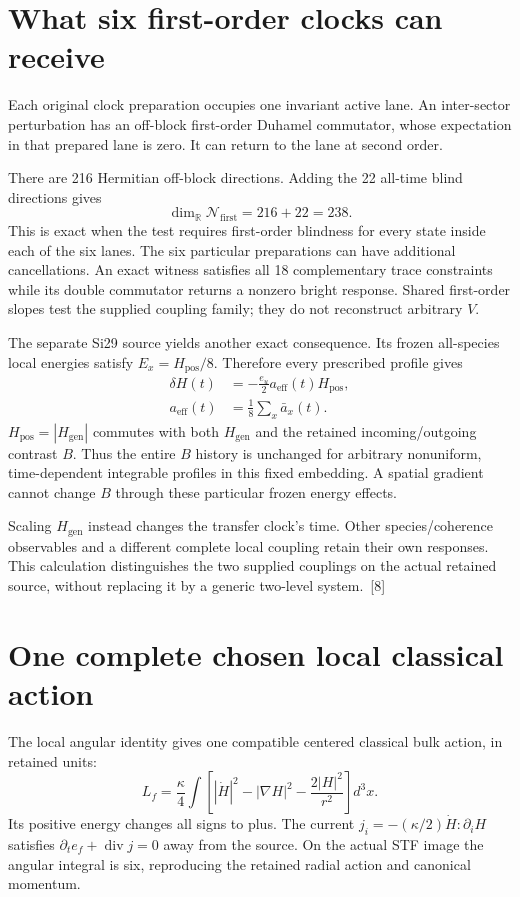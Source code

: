 \documentclass[10pt,twocolumn,letterpaper]{article}
\begin{document}
\section{What six first-order clocks can receive}
Each original clock preparation occupies one invariant active lane. An inter-sector perturbation has an off-block first-order Duhamel commutator, whose expectation in that prepared lane is zero. It can return to the lane at second order.

There are 216 Hermitian off-block directions. Adding the 22 all-time blind directions gives
\[
\dim_{\mathbb R}\mathcal N_{\mathrm{first}}=216+22=238.
\]
This is exact when the test requires first-order blindness for every state inside each of the six lanes. The six particular preparations can have additional cancellations. An exact witness satisfies all 18 complementary trace constraints while its double commutator returns a nonzero bright response. Shared first-order slopes test the supplied coupling family; they do not reconstruct arbitrary $V$.

The separate Si29 source yields another exact consequence. Its frozen all-species local energies satisfy $E_x=H_{\mathrm{pos}}/8$. Therefore every prescribed profile gives
\[
\begin{aligned}
\delta H(t)&=-\frac{e_u}{2}a_{\mathrm{eff}}(t)H_{\mathrm{pos}},\\
a_{\mathrm{eff}}(t)&=\frac18\sum_x\bar a_x(t).
\end{aligned}
\]
$H_{\mathrm{pos}}=|H_{\mathrm{gen}}|$ commutes with both $H_{\mathrm{gen}}$ and the retained incoming/outgoing contrast $B$. Thus the entire $B$ history is unchanged for arbitrary nonuniform, time-dependent integrable profiles in this fixed embedding. A spatial gradient cannot change $B$ through these particular frozen energy effects.

Scaling $H_{\mathrm{gen}}$ instead changes the transfer clock's time. Other species/coherence observables and a different complete local coupling retain their own responses. This calculation distinguishes the two supplied couplings on the actual retained source, without replacing it by a generic two-level system.~[8]

\section{One complete chosen local classical action}
The local angular identity gives one compatible centered classical bulk action, in retained units:
\[
L_f=\frac\kappa4\int\left[|\dot H|^2-|\nabla H|^2-\frac{2|H|^2}{r^2}\right]d^3x.
\]
Its positive energy changes all signs to plus. The current $j_i=-(\kappa/2)\dot H:\partial_iH$ satisfies $\partial_t e_f+\operatorname{div}j=0$ away from the source. On the actual STF image the angular integral is six, reproducing the retained radial action and canonical momentum.
\end{document}
